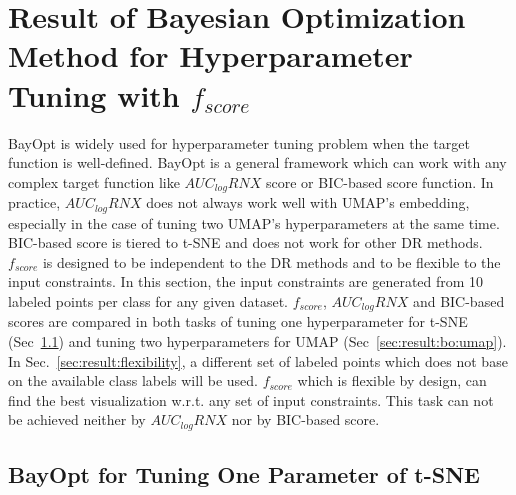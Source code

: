 \section{Result of Bayesian Optimization Method for Hyperparameter Tuning with $f_{score}$}\label{sec:result:bo}
BayOpt is widely used for hyperparameter tuning problem when the target function is well-defined.
BayOpt is a general framework which can work with any complex target function like $AUC_{log}RNX$ score or BIC-based score function.
In practice, $AUC_{log}RNX$ does not always work well with UMAP's embedding, especially in the case of tuning two UMAP's hyperparameters at the same time.
BIC-based score is tiered to t-SNE and does not work for other DR methods.
$f_{score}$ is designed to be independent to the DR methods and to be flexible to the input constraints.
In this section, the input constraints are generated from 10 labeled points per class for any given dataset.
$f_{score}$, $AUC_{log}RNX$ and BIC-based scores are compared in both tasks of tuning one hyperparameter for t-SNE (Sec~\ref{sec:result:bo:tsne}) and tuning two hyperparameters for UMAP (Sec~\ref{sec:result:bo:umap}).
In Sec.~\ref{sec:result:flexibility}, a different set of labeled points which does not base on the available class labels will be used.
$f_{score}$ which is flexible by design, can find the best visualization w.r.t. any set of input constraints.
This task can not be achieved neither by $AUC_{log}RNX$ nor by BIC-based score.

\subsection{BayOpt for Tuning One Parameter of t-SNE}\label{sec:result:bo:tsne}

